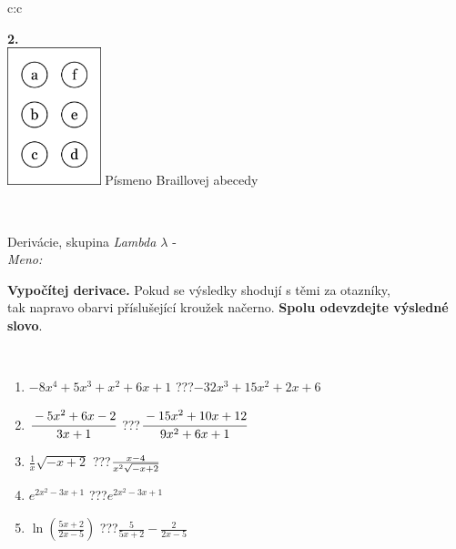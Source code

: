 \documentclass[10pt]{report}
\begin{document}
\begin{tabular}{c:c}
\begin{minipage}[c][104.5mm][t]{0.5\linewidth}
\begin{center}
\begin{minipage}{0.20\linewidth}
\begin{center}
{\Huge\bfseries 2.} \\[2mm]
\includegraphics[height=40mm]{../images/braille.png}
{\small Písmeno Braillovej abecedy}
\end{center}
\end{minipage}
\end{center}
\end{minipage}
\\ \hdashline
\begin{minipage}[c][104.5mm][t]{0.5\linewidth}
\begin{center}
\vspace{7mm}
{\huge Derivácie, skupina \textit{Lambda $\lambda$} -}\\[5mm]
\textit{Meno:}\phantom{xxxxxxxxxxxxxxxxxxxxxxxxxxxxxxxxxxxxxxxxxxxxxxxxxxxxxxxxxxxxxxxxx}\\[5mm]
\begin{minipage}{0.95\linewidth}
\begin{center}
\textbf{Vypočítej derivace.} Pokud se výsledky shodují s těmi za otazníky,\\tak napravo obarvi příslušející kroužek načerno. \textbf{Spolu odevzdejte výsledné slovo}.
\end{center}
\end{minipage}
\\[1mm]
\begin{minipage}{0.79\linewidth}
\begin{center}
\begin{varwidth}{\linewidth}
\begin{enumerate}
\normalsize
\item $-8x^4+5x^3+x^2+6x+1$\quad \dotfill\; ???\;\dotfill \quad $-32x^3+15x^2+2x+6$
\item $\cfrac{-5x^2+6x-2}{3x+1}$\quad \dotfill\; ???\;\dotfill \quad $\cfrac{-15x^2+10x+12}{9x^2+6x+1}$
\item $\frac{1}{x}\sqrt{-x+2}$\quad \dotfill\; ???\;\dotfill \quad $\frac{x-4}{x^2 \sqrt{\smash[b]{-x+2}}}$
\item $e^{2x^2-3x+1}$\quad \dotfill\; ???\;\dotfill \quad $e^{2x^2-3x+1}$
\item $\ln{\left(\frac{5x+2}{2x-5}\right)}$\quad \dotfill\; ???\;\dotfill \quad $\frac{5}{5x+2}-\frac{2}{2x-5}$

\end{enumerate}
\end{varwidth}
\end{center}
\end{minipage}
\end{center}
\end{minipage}
\end{tabular}
\end{document}
